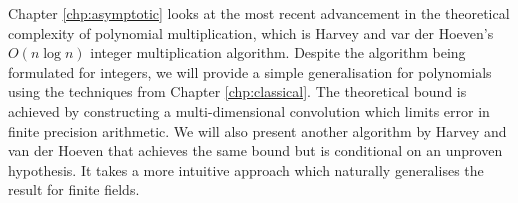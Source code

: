 Chapter \ref{chp:asymptotic} looks at the most recent advancement in the theoretical complexity of polynomial multiplication, which is Harvey and var der Hoeven's $O(n \log n)$ integer multiplication algorithm. Despite the algorithm \cite{nlogn} being formulated for integers, we will provide a simple generalisation for polynomials using the techniques from Chapter \ref{chp:classical}. The theoretical bound is achieved by constructing a multi-dimensional convolution which limits error in finite precision arithmetic. We will also present another algorithm by Harvey and van der Hoeven that achieves the same bound but is conditional on an unproven hypothesis. It takes a more intuitive approach which naturally generalises the result for finite fields.
